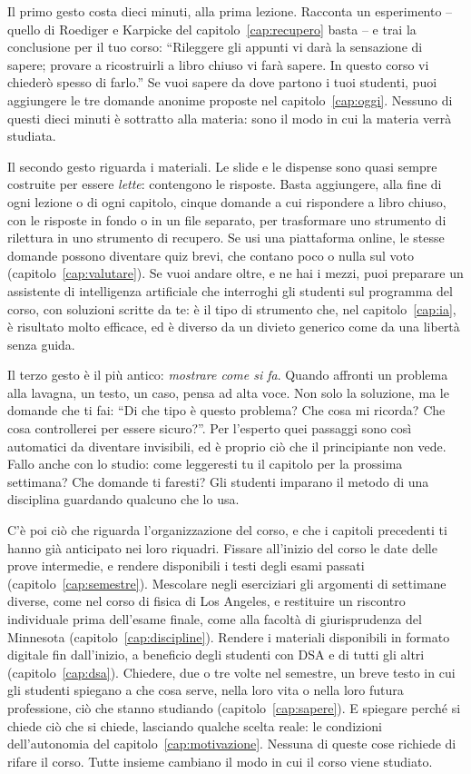 Il primo gesto costa dieci minuti, alla prima lezione. Racconta un
esperimento -- quello di Roediger e Karpicke del
capitolo~\ref{cap:recupero} basta -- e trai la conclusione per il tuo
corso: \enquote{Rileggere gli appunti vi darà la sensazione di sapere;
provare a ricostruirli a libro chiuso vi farà sapere. In questo corso
vi chiederò spesso di farlo.} Se vuoi sapere da dove partono i tuoi
studenti, puoi aggiungere le tre domande anonime proposte nel
capitolo~\ref{cap:oggi}. Nessuno di questi dieci minuti è sottratto
alla materia: sono il modo in cui la materia verrà studiata.

Il secondo gesto riguarda i materiali. Le slide e le dispense sono
quasi sempre costruite per essere \emph{lette}: contengono le risposte.
Basta aggiungere, alla fine di ogni lezione o di ogni capitolo, cinque
domande a cui rispondere a libro chiuso, con le risposte in fondo o in
un file separato, per trasformare uno strumento di rilettura in uno
strumento di recupero. Se usi una piattaforma online, le stesse
domande possono diventare quiz brevi, che contano poco o nulla sul
voto (capitolo~\ref{cap:valutare}). Se vuoi andare oltre, e ne hai i
mezzi, puoi preparare un assistente di intelligenza artificiale che
interroghi gli studenti sul programma del corso, con soluzioni scritte
da te: è il tipo di strumento che, nel capitolo~\ref{cap:ia}, è
risultato molto efficace, ed è diverso da un divieto generico come da
una libertà senza guida.

Il terzo gesto è il più antico: \emph{mostrare come si fa}. Quando
affronti un problema alla lavagna, un testo, un caso, pensa ad alta
voce. Non solo la soluzione, ma le domande che ti fai: \enquote{Di che
tipo è questo problema? Che cosa mi ricorda? Che cosa controllerei per
essere sicuro?}. Per l'esperto quei passaggi sono così automatici da
diventare invisibili, ed è proprio ciò che il principiante non vede.
Fallo anche con lo studio: come leggeresti tu il capitolo per la
prossima settimana? Che domande ti faresti? Gli studenti imparano il
metodo di una disciplina guardando qualcuno che lo usa.

C'è poi ciò che riguarda l'organizzazione del corso, e che i capitoli
precedenti ti hanno già anticipato nei loro riquadri. Fissare all'inizio
del corso le date delle prove intermedie, e rendere disponibili i testi
degli esami passati (capitolo~\ref{cap:semestre}). Mescolare negli
eserciziari gli argomenti di settimane diverse, come nel corso di
fisica di Los Angeles, e restituire un riscontro individuale prima
dell'esame finale, come alla facoltà di giurisprudenza del Minnesota
(capitolo~\ref{cap:discipline}). Rendere i materiali disponibili in
formato digitale fin dall'inizio, a beneficio degli studenti con DSA e
di tutti gli altri (capitolo~\ref{cap:dsa}). Chiedere, due o tre volte
nel semestre, un breve testo in cui gli studenti spiegano a che cosa
serve, nella loro vita o nella loro futura professione, ciò che stanno
studiando (capitolo~\ref{cap:sapere}). E spiegare perché si chiede
ciò che si chiede, lasciando qualche scelta reale: le condizioni
dell'autonomia del capitolo~\ref{cap:motivazione}. Nessuna di queste
cose richiede di rifare il corso. Tutte insieme cambiano il modo in cui
il corso viene studiato.

